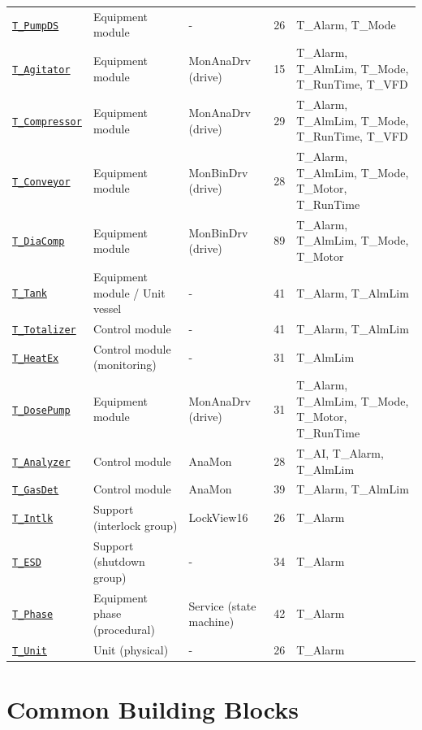 \begin{small}
\begin{longtable}{@{}P{2.60cm}P{3.70cm}P{3.70cm}P{1.40cm}P{4.69cm}@{}}
\hyperref[sec:pclib-t-pumpds]{\texttt{T\_PumpDS}} & Equipment module & - & 26 & T\_Alarm, T\_Mode \\
\hyperref[sec:pclib-t-agitator]{\texttt{T\_Agitator}} & Equipment module & MonAnaDrv (drive) & 15 & T\_Alarm, T\_AlmLim, T\_Mode, T\_RunTime, T\_VFD \\
\hyperref[sec:pclib-t-compressor]{\texttt{T\_Compressor}} & Equipment module & MonAnaDrv (drive) & 29 & T\_Alarm, T\_AlmLim, T\_Mode, T\_RunTime, T\_VFD \\
\hyperref[sec:pclib-t-conveyor]{\texttt{T\_Conveyor}} & Equipment module & MonBinDrv (drive) & 28 & T\_Alarm, T\_AlmLim, T\_Mode, T\_Motor, T\_RunTime \\
\hyperref[sec:pclib-t-diacomp]{\texttt{T\_DiaComp}} & Equipment module & MonBinDrv (drive) & 89 & T\_Alarm, T\_AlmLim, T\_Mode, T\_Motor \\
\hyperref[sec:pclib-t-tank]{\texttt{T\_Tank}} & Equipment module /\allowbreak{} Unit vessel & - & 41 & T\_Alarm, T\_AlmLim \\
\hyperref[sec:pclib-t-totalizer]{\texttt{T\_Totalizer}} & Control module & - & 41 & T\_Alarm, T\_AlmLim \\
\hyperref[sec:pclib-t-heatex]{\texttt{T\_HeatEx}} & Control module (monitoring) & - & 31 & T\_AlmLim \\
\hyperref[sec:pclib-t-dosepump]{\texttt{T\_DosePump}} & Equipment module & MonAnaDrv (drive) & 31 & T\_Alarm, T\_AlmLim, T\_Mode, T\_Motor, T\_RunTime \\
\hyperref[sec:pclib-t-analyzer]{\texttt{T\_Analyzer}} & Control module & AnaMon & 28 & T\_AI, T\_Alarm, T\_AlmLim \\
\hyperref[sec:pclib-t-gasdet]{\texttt{T\_GasDet}} & Control module & AnaMon & 39 & T\_Alarm, T\_AlmLim \\
\hyperref[sec:pclib-t-intlk]{\texttt{T\_Intlk}} & Support (interlock group) & LockView16 & 26 & T\_Alarm \\
\hyperref[sec:pclib-t-esd]{\texttt{T\_ESD}} & Support (shutdown group) & - & 34 & T\_Alarm \\
\hyperref[sec:pclib-t-phase]{\texttt{T\_Phase}} & Equipment phase (procedural) & Service (state machine) & 42 & T\_Alarm \\
\hyperref[sec:pclib-t-unit]{\texttt{T\_Unit}} & Unit (physical) & - & 26 & T\_Alarm \\
\bottomrule
\end{longtable}
\end{small}

\section{Common Building Blocks}

